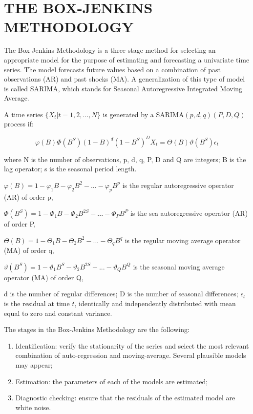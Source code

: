 \section{THE BOX-JENKINS METHODOLOGY}

The Box-Jenkins Methodology is a three stage method for selecting an appropriate model for the purpose of estimating and forecasting a univariate time series. The model forecasts future values based on a combination of past observations (AR) and past shocks (MA). A generalization of this type of model is called SARIMA, which stands for Seasonal Autoregressive Integrated Moving Average. 

A time series $\{X_t|t=1,2,...,N\}$ is generated by a SARIMA$(p,d,q)(P,D,Q)$ process if:

$$\varphi(B)\Phi(B^S)(1-B)^d(1-B^S)^DX_t=\Theta(B)\vartheta(B^S)\epsilon_t$$     

where N is the number of observations, p, d, q, P, D and Q are integers; B is the lag operator; s is the seasonal period length.

$\varphi(B)=1-\varphi_1B - \varphi_2B^2-...-\varphi_pB^p$ is the regular autoregressive operator (AR) of order p,

$\Phi(B^S)=1-\Phi_1B - \Phi_2B^{2S}-...-\Phi_PB^P$ is the sea autoregressive operator (AR) of order P,

$\Theta(B)=1-\Theta_1B - \Theta_2B^2-...-\Theta_qB^q$ is the regular moving average operator (MA) of order q,

$\vartheta(B^S)=1-\vartheta_1B^S - \vartheta_2B^{2S}-...-\vartheta_QB^Q$ is the seasonal moving average operator (MA) of order Q,

d is the number of regular differences; D is the number of seasonal differences; $\epsilon_t$ is the residual at time $t$, identically and independently distributed with mean equal to zero and constant variance. 

The stages in the Box-Jenkins Methodology are the following:
\begin{enumerate}
\item Identification: verify the stationarity of the series and select the most relevant combination of auto-regression and moving-average. Several plausible models may appear;
\item  Estimation: the parameters of  each of the models are estimated; 
\item Diagnostic checking: ensure that the residuals of the estimated model are white noise. 
\end{enumerate}

